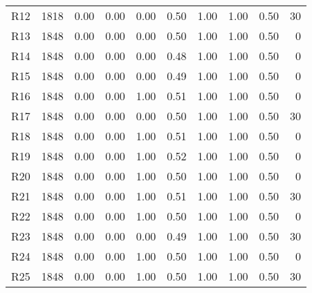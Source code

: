 \begin{table}[ht]
\begin{adjustbox}{width=\textwidth}
\begin{tabular}{lrrrrrrrrr}
  R12 & 1818 & 0.00 & 0.00 & 0.00 & 0.50 & 1.00 & 1.00 & 0.50 & 30 \\ 
  R13 & 1848 & 0.00 & 0.00 & 0.00 & 0.50 & 1.00 & 1.00 & 0.50 &  0 \\ 
  R14 & 1848 & 0.00 & 0.00 & 0.00 & 0.48 & 1.00 & 1.00 & 0.50 &  0 \\ 
  R15 & 1848 & 0.00 & 0.00 & 0.00 & 0.49 & 1.00 & 1.00 & 0.50 &  0 \\ 
  R16 & 1848 & 0.00 & 0.00 & 1.00 & 0.51 & 1.00 & 1.00 & 0.50 &  0 \\ 
  R17 & 1848 & 0.00 & 0.00 & 0.00 & 0.50 & 1.00 & 1.00 & 0.50 & 30 \\ 
  R18 & 1848 & 0.00 & 0.00 & 1.00 & 0.51 & 1.00 & 1.00 & 0.50 &  0 \\ 
  R19 & 1848 & 0.00 & 0.00 & 1.00 & 0.52 & 1.00 & 1.00 & 0.50 &  0 \\ 
  R20 & 1848 & 0.00 & 0.00 & 1.00 & 0.50 & 1.00 & 1.00 & 0.50 &  0 \\ 
  R21 & 1848 & 0.00 & 0.00 & 1.00 & 0.51 & 1.00 & 1.00 & 0.50 & 30 \\ 
  R22 & 1848 & 0.00 & 0.00 & 1.00 & 0.50 & 1.00 & 1.00 & 0.50 &  0 \\ 
  R23 & 1848 & 0.00 & 0.00 & 0.00 & 0.49 & 1.00 & 1.00 & 0.50 & 30 \\ 
  R24 & 1848 & 0.00 & 0.00 & 1.00 & 0.50 & 1.00 & 1.00 & 0.50 &  0 \\ 
  R25 & 1848 & 0.00 & 0.00 & 1.00 & 0.50 & 1.00 & 1.00 & 0.50 & 30 \\ 
  \hline
\end{tabular}
\end{adjustbox}
\endgroup
\end{table}